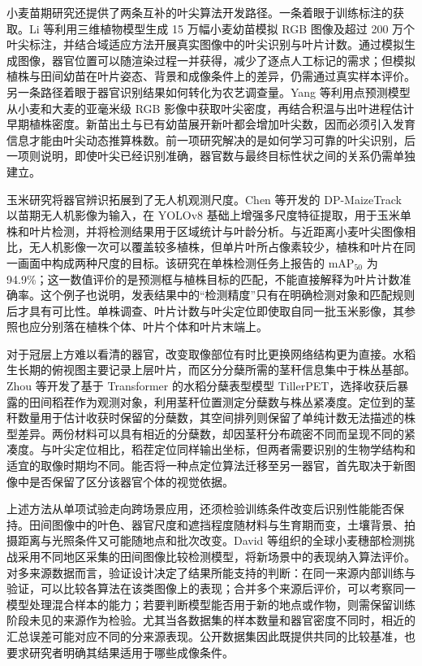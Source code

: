 小麦苗期研究还提供了两条互补的叶尖算法开发路径。一条着眼于训练标注的获取。Li 等利用三维植物模型生成 15 万幅小麦幼苗模拟 RGB 图像及超过 200 万个叶尖标注，并结合域适应方法开展真实图像中的叶尖识别与叶片计数。通过模拟生成图像，器官位置可以随渲染过程一并获得，减少了逐点人工标记的需求；但模拟植株与田间幼苗在叶片姿态、背景和成像条件上的差异，仍需通过真实样本评价。另一条路径着眼于器官识别结果如何转化为农艺调查量。Yang 等利用点预测模型从小麦和大麦的亚毫米级 RGB 影像中获取叶尖密度，再结合积温与出叶进程估计早期植株密度。新苗出土与已有幼苗展开新叶都会增加叶尖数，因而必须引入发育信息才能由叶尖动态推算株数。前一项研究解决的是如何学习可靠的叶尖识别，后一项则说明，即使叶尖已经识别准确，器官数与最终目标性状之间的关系仍需单独建立。

玉米研究将器官辨识拓展到了无人机观测尺度。Chen 等开发的 DP-MaizeTrack 以苗期无人机影像为输入，在 YOLOv8 基础上增强多尺度特征提取，用于玉米单株和叶片检测，并将检测结果用于区域统计与叶龄分析。与近距离小麦叶尖图像相比，无人机影像一次可以覆盖较多植株，但单片叶所占像素较少，植株和叶片在同一画面中构成两种尺度的目标。该研究在单株检测任务上报告的 \(\mathrm{mAP}_{50}\) 为 94.9\%；这一数值评价的是预测框与植株目标的匹配，不能直接解释为叶片计数准确率。这个例子也说明，发表结果中的“检测精度”只有在明确检测对象和匹配规则后才具有可比性。单株调查、叶片计数与叶尖定位即使取自同一批玉米影像，其参照也应分别落在植株个体、叶片个体和叶片末端上。

对于冠层上方难以看清的器官，改变取像部位有时比更换网络结构更为直接。水稻生长期的俯视图主要记录上层叶片，而区分分蘖所需的茎秆信息集中于株丛基部。Zhou 等开发了基于 Transformer 的水稻分蘖表型模型 TillerPET，选择收获后暴露的田间稻茬作为观测对象，利用茎秆位置测定分蘖数与株丛紧凑度。定位到的茎秆数量用于估计收获时保留的分蘖数，其空间排列则保留了单纯计数无法描述的株型差异。两份材料可以具有相近的分蘖数，却因茎秆分布疏密不同而呈现不同的紧凑度。与叶尖定位相比，稻茬定位同样输出坐标，但两者需要识别的生物学结构和适宜的取像时期均不同。能否将一种点定位算法迁移至另一器官，首先取决于新图像中是否保留了区分该器官个体的视觉依据。

上述方法从单项试验走向跨场景应用，还须检验训练条件改变后识别性能能否保持。田间图像中的叶色、器官尺度和遮挡程度随材料与生育期而变，土壤背景、拍摄距离与光照条件又可能随地点和批次改变。David 等组织的全球小麦穗部检测挑战采用不同地区采集的田间图像比较检测模型，将新场景中的表现纳入算法评价。对多来源数据而言，验证设计决定了结果所能支持的判断：在同一来源内部训练与验证，可以比较各算法在该类图像上的表现；合并多个来源后评价，可以考察同一模型处理混合样本的能力；若要判断模型能否用于新的地点或作物，则需保留训练阶段未见的来源作为检验。尤其当各数据集的样本数量和器官密度不同时，相近的汇总误差可能对应不同的分来源表现。公开数据集因此既提供共同的比较基准，也要求研究者明确其结果适用于哪些成像条件。

